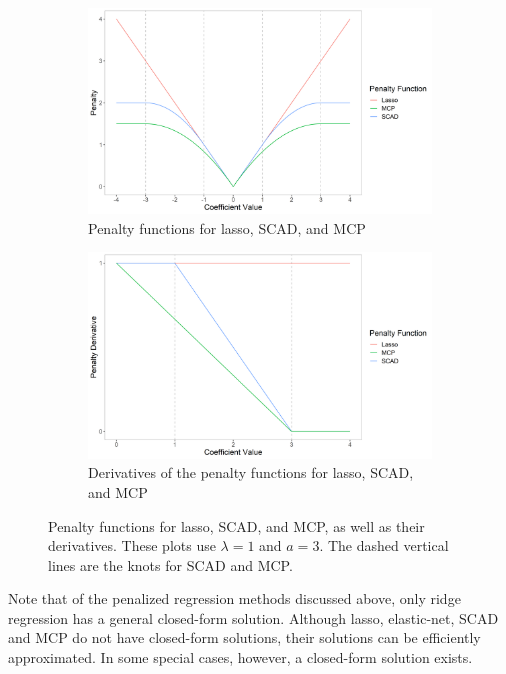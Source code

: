 \documentclass{article}
\begin{document}
\begin{figure}[!h]
	\centering
	\begin{subfigure}[b]{0.4\textwidth}
		\caption{Penalty functions for lasso, SCAD, and MCP}
		\label{fig:penalty}
		\includegraphics[width=\textwidth]{images/lasso-scad-mcp-penalty.png}
	\end{subfigure}
	\hspace{30pt}
	\begin{subfigure}[b]{0.4\textwidth}
		\caption{Derivatives of the penalty functions for lasso, SCAD, and MCP}
		\label{fig:derivative}
		\includegraphics[width=\textwidth]{images/lasso-scad-mcp-derivative.png}
	\end{subfigure}
	\captionsetup{width = 5in}
	\caption{Penalty functions for lasso, SCAD, and MCP, as well as their derivatives. These plots use $\lambda = 1$ and $a = 3$. The dashed vertical lines are the knots for SCAD and MCP.}
	\label{fig:lasso-scad-mcp}
\end{figure}

Note that of the penalized regression methods discussed above, only ridge regression has a general closed-form solution. Although lasso, elastic-net, SCAD and MCP do not have closed-form solutions, their solutions can be efficiently approximated. In some special cases, however, a closed-form solution exists. 
\end{document}
